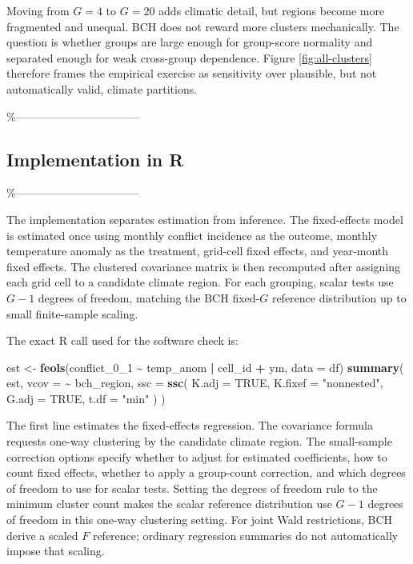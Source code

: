 \documentclass[
]{article}
\newenvironment{Shaded}{\begin{snugshade}}{\end{snugshade}}
\newcommand{\AttributeTok}[1]{\textcolor[rgb]{0.13,0.29,0.53}{#1}}
\newcommand{\ConstantTok}[1]{\textcolor[rgb]{0.56,0.35,0.01}{#1}}
\newcommand{\FunctionTok}[1]{\textcolor[rgb]{0.13,0.29,0.53}{\textbf{#1}}}
\newcommand{\NormalTok}[1]{#1}
\newcommand{\OtherTok}[1]{\textcolor[rgb]{0.56,0.35,0.01}{#1}}
\newcommand{\SpecialCharTok}[1]{\textcolor[rgb]{0.81,0.36,0.00}{\textbf{#1}}}
\newcommand{\StringTok}[1]{\textcolor[rgb]{0.31,0.60,0.02}{#1}}
\begin{document}
Moving from \(G=4\) to \(G=20\) adds climatic detail, but regions become
more fragmented and unequal. BCH does not reward more clusters
mechanically. The question is whether groups are large enough for
group-score normality and separated enough for weak cross-group
dependence. Figure \ref{fig:all-clusters} therefore frames the empirical
exercise as sensitivity over plausible, but not automatically valid,
climate partitions.

\%---------------------------------

\subsection{Implementation in R}

\%---------------------------------

The implementation separates estimation from inference. The
fixed-effects model is estimated once using monthly conflict incidence
as the outcome, monthly temperature anomaly as the treatment, grid-cell
fixed effects, and year-month fixed effects. The clustered covariance
matrix is then recomputed after assigning each grid cell to a candidate
climate region. For each grouping, scalar tests use \(G-1\) degrees of
freedom, matching the BCH fixed-\(G\) reference distribution up to small
finite-sample scaling.

The exact R call used for the software check is:

\begin{Shaded}
\begin{Highlighting}[]
\NormalTok{est }\OtherTok{\textless{}{-}} \FunctionTok{feols}\NormalTok{(conflict\_0\_1 }\SpecialCharTok{\textasciitilde{}}\NormalTok{ temp\_anom }\SpecialCharTok{|}\NormalTok{ cell\_id }\SpecialCharTok{+}\NormalTok{ ym, }\AttributeTok{data =}\NormalTok{ df)}
\FunctionTok{summary}\NormalTok{(}
\NormalTok{  est,}
  \AttributeTok{vcov =} \SpecialCharTok{\textasciitilde{}}\NormalTok{ bch\_region,}
  \AttributeTok{ssc =} \FunctionTok{ssc}\NormalTok{(}
    \AttributeTok{K.adj =} \ConstantTok{TRUE}\NormalTok{,}
    \AttributeTok{K.fixef =} \StringTok{"nonnested"}\NormalTok{,}
    \AttributeTok{G.adj =} \ConstantTok{TRUE}\NormalTok{,}
    \AttributeTok{t.df =} \StringTok{"min"}
\NormalTok{  )}
\NormalTok{)}
\end{Highlighting}
\end{Shaded}

The first line estimates the fixed-effects regression. The covariance
formula requests one-way clustering by the candidate climate region. The
small-sample correction options specify whether to adjust for estimated
coefficients, how to count fixed effects, whether to apply a group-count
correction, and which degrees of freedom to use for scalar tests.
Setting the degrees of freedom rule to the minimum cluster count makes
the scalar reference distribution use \(G-1\) degrees of freedom in this
one-way clustering setting. For joint Wald restrictions, BCH derive a
scaled \(F\) reference; ordinary regression summaries do not
automatically impose that scaling.
\end{document}
